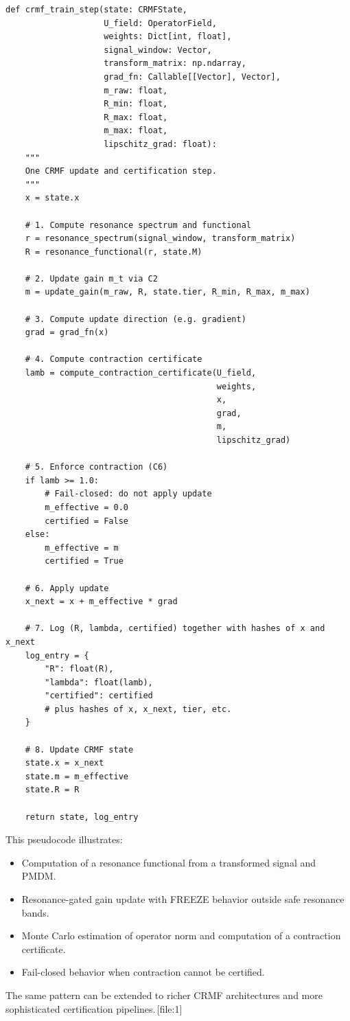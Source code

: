 \documentclass[11pt]{article}
\begin{document}
\begin{verbatim}
def crmf_train_step(state: CRMFState,
                    U_field: OperatorField,
                    weights: Dict[int, float],
                    signal_window: Vector,
                    transform_matrix: np.ndarray,
                    grad_fn: Callable[[Vector], Vector],
                    m_raw: float,
                    R_min: float,
                    R_max: float,
                    m_max: float,
                    lipschitz_grad: float):
    """
    One CRMF update and certification step.
    """
    x = state.x

    # 1. Compute resonance spectrum and functional
    r = resonance_spectrum(signal_window, transform_matrix)
    R = resonance_functional(r, state.M)

    # 2. Update gain m_t via C2
    m = update_gain(m_raw, R, state.tier, R_min, R_max, m_max)

    # 3. Compute update direction (e.g. gradient)
    grad = grad_fn(x)

    # 4. Compute contraction certificate
    lamb = compute_contraction_certificate(U_field,
                                           weights,
                                           x,
                                           grad,
                                           m,
                                           lipschitz_grad)

    # 5. Enforce contraction (C6)
    if lamb >= 1.0:
        # Fail-closed: do not apply update
        m_effective = 0.0
        certified = False
    else:
        m_effective = m
        certified = True

    # 6. Apply update
    x_next = x + m_effective * grad

    # 7. Log (R, lambda, certified) together with hashes of x and x_next
    log_entry = {
        "R": float(R),
        "lambda": float(lamb),
        "certified": certified
        # plus hashes of x, x_next, tier, etc.
    }

    # 8. Update CRMF state
    state.x = x_next
    state.m = m_effective
    state.R = R

    return state, log_entry
\end{verbatim}

This pseudocode illustrates:
\begin{itemize}[leftmargin=1.5em]
  \item Computation of a resonance functional from a transformed signal and PMDM.
  \item Resonance-gated gain update with FREEZE behavior outside safe resonance bands.
  \item Monte Carlo estimation of operator norm and computation of a contraction certificate.
  \item Fail-closed behavior when contraction cannot be certified.
\end{itemize}
The same pattern can be extended to richer CRMF architectures and more sophisticated certification pipelines.\,[file:1]
\end{document}
